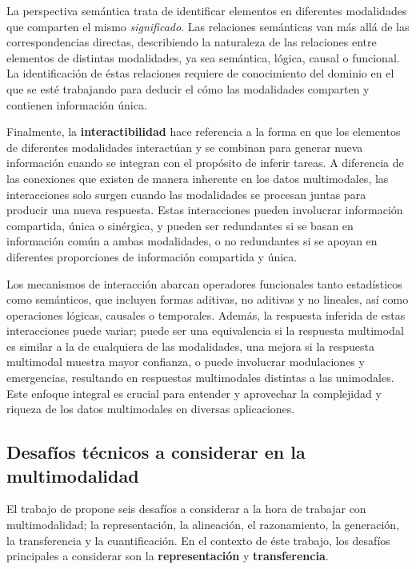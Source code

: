 \documentclass[../tesis.tex]{subfiles}
\begin{document}
La perspectiva semántica trata de identificar elementos en diferentes modalidades que comparten el mismo \textit{significado}. Las relaciones semánticas van más allá de las correspondencias directas, describiendo la naturaleza de las relaciones entre elementos de distintas modalidades, ya sea semántica, lógica, causal o funcional. La identificación de éstas relaciones requiere de conocimiento del dominio en el que se esté trabajando para deducir el cómo las modalidades comparten y contienen información única.\par\null\par

Finalmente, la \textbf{interactibilidad} hace referencia a la forma en que los elementos de diferentes modalidades interactúan y se combinan para generar nueva información cuando se integran con el propósito de inferir tareas. A diferencia de las conexiones que existen de manera inherente en los datos multimodales, las interacciones solo surgen cuando las modalidades se procesan juntas para producir una nueva respuesta. Estas interacciones pueden involucrar información compartida, única o sinérgica, y pueden ser redundantes si se basan en información común a ambas modalidades, o no redundantes si se apoyan en diferentes proporciones de información compartida y única.\par\null\par

Los mecanismos de interacción abarcan operadores funcionales tanto estadísticos como semánticos, que incluyen formas aditivas, no aditivas y no lineales, así como operaciones lógicas, causales o temporales. Además, la respuesta inferida de estas interacciones puede variar; puede ser una equivalencia si la respuesta multimodal es similar a la de cualquiera de las modalidades, una mejora si la respuesta multimodal muestra mayor confianza, o puede involucrar modulaciones y emergencias, resultando en respuestas multimodales distintas a las unimodales. Este enfoque integral es crucial para entender y aprovechar la complejidad y riqueza de los datos multimodales en diversas aplicaciones.\par\null\par

\subsection{Desafíos técnicos a considerar en la multimodalidad}
El trabajo de \cite{multimodality} propone seis desafíos a considerar a la hora de trabajar con multimodalidad; la representación, la alineación, el razonamiento, la generación, la transferencia y la cuantificación. En el contexto de éste trabajo, los desafíos principales a considerar son la \textbf{representación} y \textbf{transferencia}. \par\null\par
\end{document}
